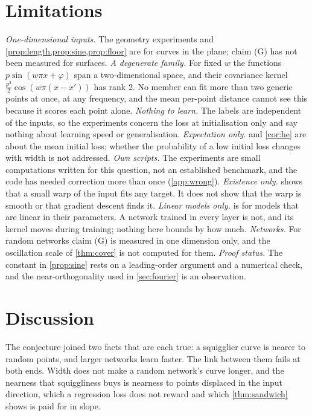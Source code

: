 \section{Limitations}
\label{sec:limitations}

\emph{One-dimensional inputs.} The geometry experiments and
\cref{prop:length,prop:sine,prop:floor} are for curves in the plane; claim (G)
has not been measured for surfaces.
\emph{A degenerate family.} For fixed $w$ the functions $p\sin(w\pi x+\varphi)$
span a two-dimensional space, and their covariance kernel
$\tfrac{p^2}{2}\cos(w\pi(x-x'))$ has rank 2. No member can fit more than two
generic points at once, at any frequency, and the mean per-point distance
cannot see this because it scores each point alone.
\emph{Nothing to learn.} The labels are independent of the inputs, so the
experiments concern the loss at initialisation only and say nothing about
learning speed or generalisation.
\emph{Expectation only.}  and \cref{cor:he} are about the
mean initial loss; whether the probability of a low initial loss changes with
width is not addressed.
\emph{Own scripts.} The experiments are small computations written for this
question, not an established benchmark, and the code has needed correction more
than once (\cref{app:wrong}).
\emph{Existence only.}  shows that a small warp of the input
fits any target. It does not show that the warp is smooth or that gradient
descent finds it.
\emph{Linear models only.}  is for models that are linear in
their parameters. A network trained in every layer is not, and its kernel moves
during training; nothing here bounds by how much.
\emph{Networks.} For random networks claim (G) is measured in one dimension
only, and the oscillation scale of \cref{thm:cover} is not computed for them.
\emph{Proof status.} The constant in \cref{prop:sine} rests on a leading-order
argument and a numerical check, and the near-orthogonality used in
\cref{sec:fourier} is an observation.

\section{Discussion}
\label{sec:discussion}

The conjecture joined two facts that are each true: a squigglier curve is
nearer to random points, and larger networks learn faster. The link between
them fails at both ends. Width does not make a random network's curve longer,
and the nearness that squiggliness buys is nearness to points displaced in the
input direction, which a regression loss does not reward and which
\cref{thm:sandwich} shows is paid for in slope.

